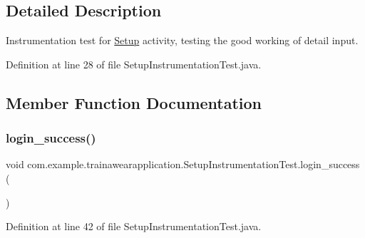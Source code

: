 \subsection{Detailed Description}
Instrumentation test for \mbox{\hyperlink{classcom_1_1example_1_1trainawearapplication_1_1_setup}{Setup}} activity, testing the good working of detail input. 

Definition at line 28 of file Setup\+Instrumentation\+Test.\+java.



\subsection{Member Function Documentation}
\mbox{\label{classcom_1_1example_1_1trainawearapplication_1_1_setup_instrumentation_test_a4dbc2cfc0d101616f6c60f075bc55d58}} 
\subsubsection{\texorpdfstring{login\_success()}{login\_success()}}
{\footnotesize\ttfamily void com.\+example.\+trainawearapplication.\+Setup\+Instrumentation\+Test.\+login\+\_\+success (\begin{DoxyParamCaption}{ }\end{DoxyParamCaption})\hspace{0.3cm}{\ttfamily [inline]}}



Definition at line 42 of file Setup\+Instrumentation\+Test.\+java.



